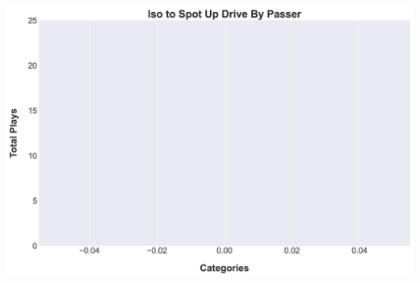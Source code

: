 \documentclass[a4paper,12pt]{article}
\begin{document}
\begin{table}[H]
{\begin{minipage}[t]{0.6\textwidth}
{\begin{tabular}
                
            
                
            
                
            
                
            
                
            
                
            
                
            
                
            
                
            
                
            
                
            
                
            
                
            
                
            
                
            

            \bottomrule
        \end{tabular}
        } %
    \end{minipage}
    } %
    \hfill %
    \begin{minipage}[c]{0.35\textwidth} %
        \flushright
        \includegraphics[width=\textwidth, height=.14\textheight]{images/SpotUp_IsoDrivesPlayer_Freq.png} %
    \end{minipage}
\end{table}
\end{document}
